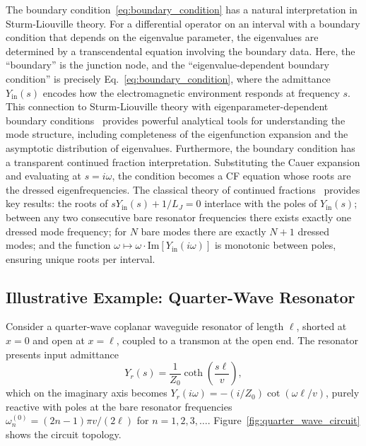 \documentclass[reprint, floatfix, superscriptaddress, amsmath, amssymb, longbibliography]{revtex4-2}
\begin{document}
The boundary condition~\eqref{eq:boundary_condition} has a natural interpretation in Sturm-Liouville theory. For a differential operator on an interval with a boundary condition that depends on the eigenvalue parameter, the eigenvalues are determined by a transcendental equation involving the boundary data. Here, the ``boundary'' is the junction node, and the ``eigenvalue-dependent boundary condition'' is precisely Eq.~\eqref{eq:boundary_condition}, where the admittance $Y_{\mathrm{in}}(s)$ encodes how the electromagnetic environment responds at frequency $s$. This connection to Sturm-Liouville theory with eigenparameter-dependent boundary conditions~\cite{Fulton1977, Walter1973} provides powerful analytical tools for understanding the mode structure, including completeness of the eigenfunction expansion and the asymptotic distribution of eigenvalues. Furthermore, the boundary condition has a transparent continued fraction interpretation. Substituting the Cauer expansion and evaluating at $s = i\omega$, the condition becomes a CF equation whose roots are the dressed eigenfrequencies. The classical theory of continued fractions~\cite{Wall1948, Jones1980} provides key results: the roots of $sY_{\mathrm{in}}(s) + 1/L_J = 0$ interlace with the poles of $Y_{\mathrm{in}}(s)$; between any two consecutive bare resonator frequencies there exists exactly one dressed mode frequency; for $N$ bare modes there are exactly $N+1$ dressed modes; and the function $\omega \mapsto \omega \cdot \mathrm{Im}[Y_{\mathrm{in}}(i\omega)]$ is monotonic between poles, ensuring unique roots per interval.

\subsection{Illustrative Example: Quarter-Wave Resonator}
\label{sec:example_qw}

Consider a quarter-wave coplanar waveguide resonator of length $\ell$, shorted at $x = 0$ and open at $x = \ell$, coupled to a transmon at the open end. The resonator presents input admittance
\begin{equation}
Y_r(s) = \frac{1}{Z_0}\coth\left(\frac{s\ell}{v}\right),
\label{eq:resonator_admittance}
\end{equation}
which on the imaginary axis becomes $Y_r(i\omega) = -(i/Z_0)\cot(\omega\ell/v)$, purely reactive with poles at the bare resonator frequencies $\omega_n^{(0)} = (2n-1)\pi v/(2\ell)$ for $n = 1, 2, 3, \ldots$. Figure~\ref{fig:quarter_wave_circuit} shows the circuit topology.
\end{document}
